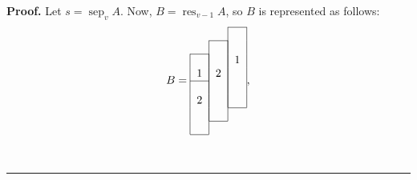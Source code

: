\documentclass[numbers=enddot,12pt,final,onecolumn,notitlepage]{scrartcl}%
\theoremstyle{definition}
\newenvironment{proof}[1][Proof]{\noindent\textbf{#1.} }{\ \rule{0.5em}{0.5em}}
\begin{document}
\begin{proof}
Let $s=\operatorname*{sep}\nolimits_{v}A$. Now, $B = \operatorname*{res}\nolimits_{v-1}A$, so $B$ is
represented as follows:%
\[
B=%
\begin{tabular}{ccc}
\cline{3-3} & & \multicolumn{1}{|c|}{} \\
\cline{2-2} & \multicolumn{1}{|c|}{} & \multicolumn{1}{|c|}{} \\
\cline{1-1} \multicolumn{1}{|c|}{} & \multicolumn{1}{|c|}{} & \multicolumn
{1}{|c|}{1} \\
\multicolumn{1}{|c|}{1} & \multicolumn{1}{|c|}{2} & \multicolumn{1}{|c|}{} \\
\cline{1-1} \multicolumn{1}{|c|}{} & \multicolumn{1}{|c|}{} & \multicolumn
{1}{|c|}{} \\
\multicolumn{1}{|c|}{2} & \multicolumn{1}{|c|}{} & \multicolumn{1}{|c|}{} \\
\cline{3-3} \multicolumn{1}{|c|}{} & \multicolumn{1}{|c|}{} \\
\cline{2-2} \multicolumn{1}{|c|}{} \\
\cline{1-1}
\end{tabular}%
,
\]

\end{proof}
\end{document}
